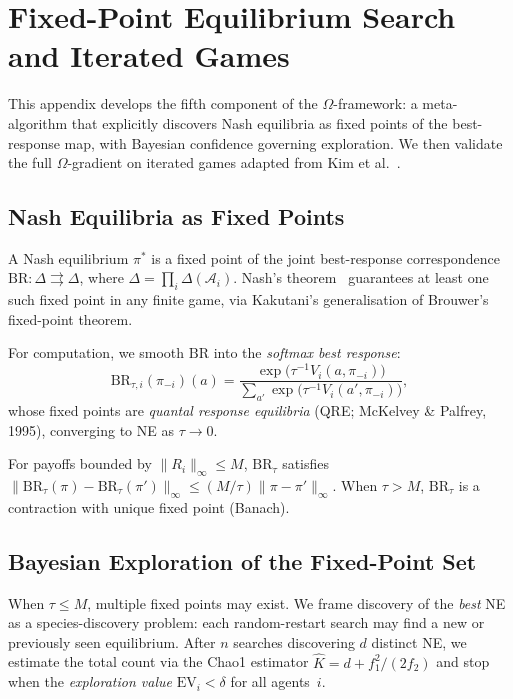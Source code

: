 \chapter{Fixed-Point Equilibrium Search and Iterated Games}
\label{app:fpne}

This appendix develops the fifth component of the $\Omega$-framework: a meta-algorithm that explicitly discovers Nash equilibria as fixed points of the best-response map, with Bayesian confidence governing exploration. We then validate the full $\Omega$-gradient on iterated games adapted from Kim et al.~\cite{kim2021policygradientalgorithmlearning}.


\section{Nash Equilibria as Fixed Points}

A Nash equilibrium $\pi^*$ is a fixed point of the joint best-response correspondence $\mathrm{BR} : \Delta \rightrightarrows \Delta$, where $\Delta = \prod_i \Delta(\mathcal{A}_i)$. Nash's theorem~\cite{nash1950} guarantees at least one such fixed point in any finite game, via Kakutani's generalisation of Brouwer's fixed-point theorem.

For computation, we smooth $\mathrm{BR}$ into the \emph{softmax best response}:
\begin{equation}\label{eq:soft-br-app}
    \mathrm{BR}_{\tau,i}(\pi_{-i})(a) = \frac{\exp\bigl(\tau^{-1} V_i(a, \pi_{-i})\bigr)}
    {\sum_{a'} \exp\bigl(\tau^{-1} V_i(a', \pi_{-i})\bigr)},
\end{equation}
whose fixed points are \emph{quantal response equilibria} (QRE; McKelvey \& Palfrey, 1995), converging to NE as $\tau \to 0$.

\begin{theorem}
\label{thm:contraction-app}
For payoffs bounded by $\|R_i\|_\infty \leq M$, $\mathrm{BR}_\tau$ satisfies $\|\mathrm{BR}_\tau(\pi) - \mathrm{BR}_\tau(\pi')\|_\infty \leq (M/\tau)\|\pi - \pi'\|_\infty$. When $\tau > M$, $\mathrm{BR}_\tau$ is a contraction with unique fixed point (Banach).
\end{theorem}


\section{Bayesian Exploration of the Fixed-Point Set}

When $\tau \leq M$, multiple fixed points may exist. We frame discovery of the \emph{best} NE as a species-discovery problem: each random-restart search may find a new or previously seen equilibrium. After $n$ searches discovering $d$ distinct NE, we estimate the total count via the Chao1 estimator $\hat{K} = d + f_1^2/(2f_2)$ and stop when the \emph{exploration value} $\mathrm{EV}_i < \delta$ for all agents~$i$.

